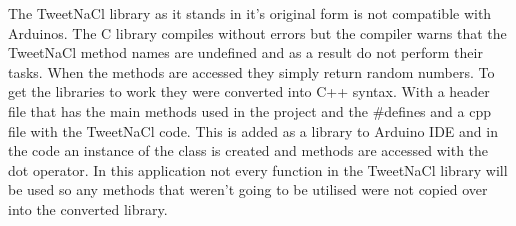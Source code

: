 The TweetNaCl library as it stands in it's original form is not compatible with Arduinos. The C library compiles without errors but the compiler warns that the TweetNaCl method names are undefined and as a result do not perform their tasks. When the methods are accessed they simply return random numbers. To get the libraries to work they were converted into C++ syntax. With a header file that has the main methods used in the project and the \#defines and a cpp file with the TweetNaCl code. This is added as a library to Arduino IDE and in the code an instance of the class is created and methods are accessed with the dot operator. In this application not every function in the TweetNaCl library will be used so any methods that weren't going to be utilised were not copied over into the converted library.



